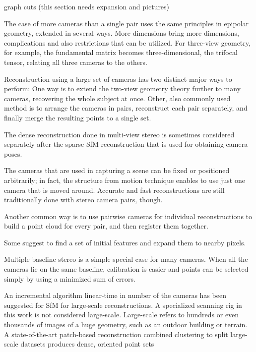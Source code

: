 graph cuts
\cite{jancosek2011multi}
\cite{chang2011gpu}
(this section needs expansion and pictures)

The case of more cameras than a single pair uses the same principles in epipolar geometry, extended in several ways.
More dimensions bring more dimensions, complications and also restrictions that can be utilized.
For three-view geometry, for example, the fundamental matrix becomes three-dimensional, the trifocal tensor, relating all three cameras to the others. \cite{hartley03multiview}

Reconstruction using a large set of cameras has two distinct major ways to perform:
One way is to extend the two-view geometry theory further to many cameras, recovering the whole subject at once.
Other, also commonly used method is to arrange the cameras in pairs, reconstruct each pair separately, and finally merge the resulting points to a single set.


The dense reconstruction done in multi-view stereo is sometimes considered separately after the sparse SfM reconstruction that is used for obtaining camera poses.

The cameras that are used in capturing a scene can be fixed or positioned arbitrarily; in fact, the structure from motion technique enables to use just one camera that is moved around.
Accurate and fast reconstructions are still traditionally done with stereo camera pairs, though.

Another common way is to use pairwise cameras for individual reconstructions to build a point cloud for every pair, and then register them together. \cite{bradley2010high}

Some suggest to find a set of initial features and expand them to nearby pixels. %

Multiple baseline stereo is a simple special case for many cameras. When all the cameras lie on the same baseline, calibration is easier and points can be selected simply by using a minimized sum of errors. \cite{okutomi1993multiple}

An incremental algorithm linear-time in number of the cameras has been suggested for SfM for large-scale reconstructions. \cite{wu2013towards}
A specialized scanning rig in this work is not considered large-scale.
Large-scale refers to hundreds or even thousands of images of a huge geometry, such as an outdoor building or terrain.
A state-of-the-art patch-based reconstruction combined clustering to split large-scale datasets produces dense, oriented point sets \cite{furukawa2012patch,furukawa2010accurate}

